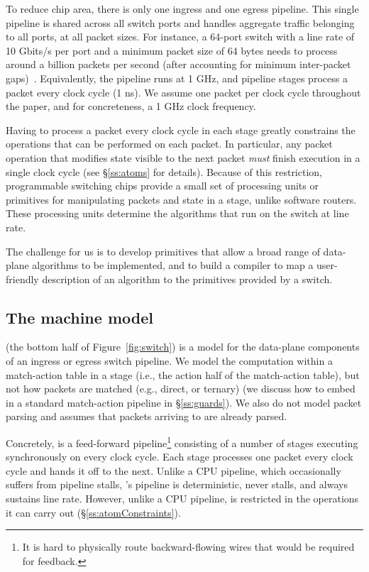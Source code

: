 To reduce chip area, there is only one ingress and one egress pipeline.  This
single pipeline is shared across all switch ports and handles aggregate traffic
belonging to all ports, at all packet sizes.  For instance, a 64-port switch
with a line rate of 10 Gbits/s per port and a minimum packet size of 64 bytes
needs to process around a billion packets per second (after accounting for
minimum inter-packet gaps)~\cite{rmt}.  Equivalently, the pipeline runs at 1
GHz, and pipeline stages process a packet every clock cycle (1 ns).  We assume
one packet per clock cycle throughout the paper, and for concreteness, a
1 GHz clock frequency.

Having to process a packet every clock cycle in each stage greatly constrains
the operations that can be performed on each packet. In particular, any packet
operation that modifies state visible to the next packet {\em must} finish
execution in a single clock cycle (see \S\ref{ss:atoms} for details). Because
of this restriction, programmable switching chips provide a small set of
processing units or primitives for manipulating packets and state in a stage,
unlike software routers. These processing units determine the algorithms that
run on the switch at line rate.

The challenge for us is to develop primitives that allow a broad range of
data-plane algorithms to be implemented, and to build a compiler to map a
user-friendly description of an algorithm to the primitives provided by a
switch.

\subsection{The \absmachine machine model}

\absmachine (the bottom half of Figure~\ref{fig:switch}) is a model for the
data-plane components of an ingress or egress switch pipeline.  We model the
computation within a match-action table in a stage (i.e., the action half of
the match-action table), but not how packets are matched (e.g., direct, or
ternary) (we discuss how to embed \absmachine in a standard match-action
pipeline in \S\ref{ss:guards}).  We also do not model packet parsing and
assumes that packets arriving to \absmachine are already parsed.

 Concretely, \absmachine is a feed-forward pipeline\footnote{It is hard to
physically route backward-flowing wires that would be required for feedback.}
consisting of a number of stages executing synchronously on every clock cycle.
Each stage processes one packet every clock cycle and hands it off to the next.
Unlike a CPU pipeline, which occasionally suffers from pipeline stalls,
\absmachine's pipeline is deterministic, never stalls, and always sustains line
rate. However, unlike a CPU pipeline, \absmachine is restricted in the
operations it can carry out (\S\ref{ss:atomConstraints}).

